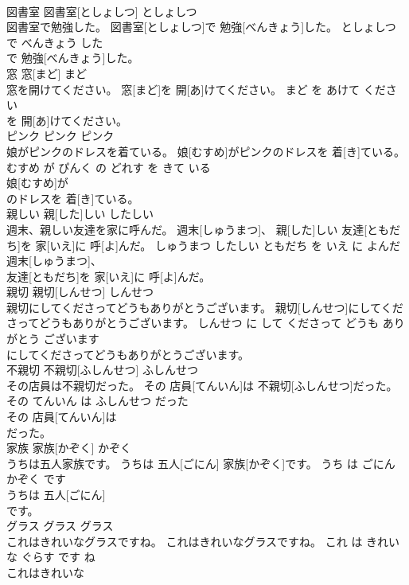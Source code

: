 \documentclass[8pt]{extreport}
\begin{document}
\begin{CJK}{UTF8}{min}
\\	図書室	図書室[としょしつ]	としょしつ	
\\	図書室で勉強した。	図書室[としょしつ]で 勉強[べんきょう]した。	としょしつ で べんきょう した	
\\	で 勉強[べんきょう]した。		
\\	窓	窓[まど]	まど	
\\	窓を開けてください。	窓[まど]を 開[あ]けてください。	まど を あけて ください	
\\	を 開[あ]けてください。		
\\	ピンク	ピンク	ピンク	
\\	娘がピンクのドレスを着ている。	娘[むすめ]がピンクのドレスを 着[き]ている。	むすめ が ぴんく の どれす を きて いる	
\\	娘[むすめ]が
\\	のドレスを 着[き]ている。		
\\	親しい	親[した]しい	したしい	
\\	週末、親しい友達を家に呼んだ。	週末[しゅうまつ]、 親[した]しい 友達[ともだち]を 家[いえ]に 呼[よ]んだ。	しゅうまつ したしい ともだち を いえ に よんだ	
\\	週末[しゅうまつ]、
\\	友達[ともだち]を 家[いえ]に 呼[よ]んだ。		
\\	親切	親切[しんせつ]	しんせつ	
\\	親切にしてくださってどうもありがとうございます。	親切[しんせつ]にしてくださってどうもありがとうございます。	しんせつ に して くださって どうも ありがとう ございます	
\\	にしてくださってどうもありがとうございます。		
\\	不親切	不親切[ふしんせつ]	ふしんせつ	
\\	その店員は不親切だった。	その 店員[てんいん]は 不親切[ふしんせつ]だった。	その てんいん は ふしんせつ だった	
\\	その 店員[てんいん]は
\\	だった。		
\\	家族	家族[かぞく]	かぞく	
\\	うちは五人家族です。	うちは 五人[ごにん] 家族[かぞく]です。	うち は ごにん かぞく です	
\\	うちは 五人[ごにん]
\\	です。		
\\	グラス	グラス	グラス	
\\	これはきれいなグラスですね。	これはきれいなグラスですね。	これ は きれい な ぐらす です ね	
\\	これはきれいな

\end{CJK}
\end{document}
